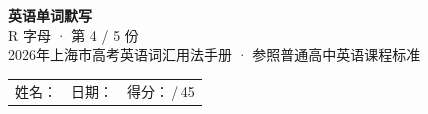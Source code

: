 \documentclass[10pt,a4paper]{article}
\begin{document}
\pagestyle{plain}

\begin{center}
{\LARGE\bfseries 英语单词默写}\\[0.22em]
{\large R 字母 · 第 4 / 5 份}\\[0.18em]
{\small 2026年上海市高考英语词汇用法手册 · 参照普通高中英语课程标准}
\end{center}

\vspace{0.25em}
\noindent\begin{tabular}{@{}p{}@{}p{}@{}p{}@{}}
姓名：\underline{\hspace{2.0cm}} & 日期：\underline{\hspace{2.0cm}} & 得分：\underline{\hspace{1.3cm}}\,/\,45 \\
\end{tabular}

\vspace{0.3em}

\vspace{0.08em}
\end{document}
